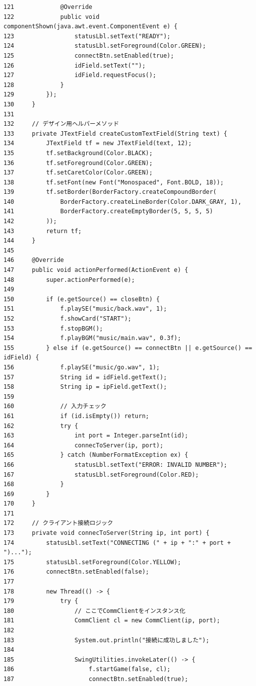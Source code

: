 \documentclass[11pt,a4j]{jarticle}
\begin{document}
\begin{small}
\begin{verbatim}
121             @Override
122             public void componentShown(java.awt.event.ComponentEvent e) {
123                 statusLbl.setText("READY");
124                 statusLbl.setForeground(Color.GREEN);
125                 connectBtn.setEnabled(true);
126                 idField.setText("");
127                 idField.requestFocus();
128             }
129         });
130     }
131 
132     // デザイン用ヘルパーメソッド
133     private JTextField createCustomTextField(String text) {
134         JTextField tf = new JTextField(text, 12);
135         tf.setBackground(Color.BLACK);
136         tf.setForeground(Color.GREEN);
137         tf.setCaretColor(Color.GREEN);
138         tf.setFont(new Font("Monospaced", Font.BOLD, 18));
139         tf.setBorder(BorderFactory.createCompoundBorder(
140             BorderFactory.createLineBorder(Color.DARK_GRAY, 1),
141             BorderFactory.createEmptyBorder(5, 5, 5, 5)
142         ));
143         return tf;
144     }
145 
146     @Override
147     public void actionPerformed(ActionEvent e) {
148         super.actionPerformed(e);
149 
150         if (e.getSource() == closeBtn) {
151             f.playSE("music/back.wav", 1);
152             f.showCard("START");
153             f.stopBGM();
154             f.playBGM("music/main.wav", 0.3f);
155         } else if (e.getSource() == connectBtn || e.getSource() == idField) {    
156             f.playSE("music/go.wav", 1);
157             String id = idField.getText();
158             String ip = ipField.getText();
159 
160             // 入力チェック
161             if (id.isEmpty()) return;
162             try {
163                 int port = Integer.parseInt(id);
164                 connecToServer(ip, port);
165             } catch (NumberFormatException ex) {
166                 statusLbl.setText("ERROR: INVALID NUMBER");
167                 statusLbl.setForeground(Color.RED);
168             }
169         }
170     }
171 
172     // クライアント接続ロジック
173     private void connecToServer(String ip, int port) {
174         statusLbl.setText("CONNECTING (" + ip + ":" + port + ")...");
175         statusLbl.setForeground(Color.YELLOW);
176         connectBtn.setEnabled(false);
177 
178         new Thread(() -> {
179             try {
180                 // ここでCommClientをインスタンス化
181                 CommClient cl = new CommClient(ip, port);
182                 
183                 System.out.println("接続に成功しました");
184 
185                 SwingUtilities.invokeLater(() -> {
186                     f.startGame(false, cl);
187                     connectBtn.setEnabled(true);

\end{verbatim}
\end{small}
\end{document}
